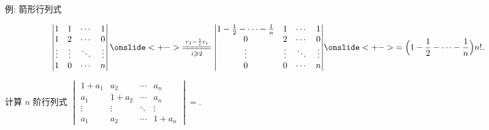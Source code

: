 \begin{frame}{例: 箭形行列式}
	\onslide<+->
	\begin{example}
		\[\begin{vmatrix}
			1&1&\cdots&1\\
			1&2&\cdots&0\\
			\vdots&\vdots&\ddots&\vdots\\
			1&0&\cdots&n
		\end{vmatrix}\onslide<+->{\xeq[i\ge 2]{r_1-\frac1i r_i}
		\begin{vmatrix}
			1-\frac12-\cdots-\frac1n&1&\cdots&1\\
			0&2&\cdots&0\\
			\vdots&\vdots&\ddots&\vdots\\
			0&0&\cdots&n
		\end{vmatrix}}
		\onslide<+->{=\Bigl(1-\frac12-\cdots-\frac1n\Bigr)n!.}\]
	\end{example}
	\onslide<+->
	\begin{exercise}
		计算 $n$ 阶行列式 $\begin{vmatrix}
			1+a_1&a_2&\cdots&a_n\\
			a_1&1+a_2&\cdots&a_n\\
			\vdots&\vdots&\ddots&\vdots\\
			a_1&a_2&\cdots&1+a_n
		\end{vmatrix}=$.
	\end{exercise}
\end{frame}


